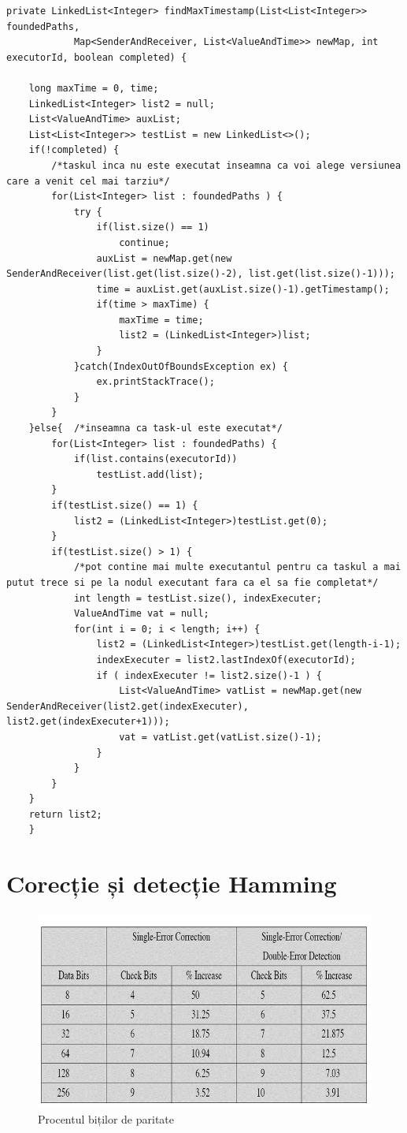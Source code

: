 \documentclass[12pt,a4paper]{report}
\begin{document}
\begin{lstlisting}[label={alg:findMaxTimestamp},caption={Aflarea versiunii potrivite}]
private LinkedList<Integer> findMaxTimestamp(List<List<Integer>> foundedPaths,
			Map<SenderAndReceiver, List<ValueAndTime>> newMap, int executorId, boolean completed) {
			
	long maxTime = 0, time;
	LinkedList<Integer> list2 = null;
	List<ValueAndTime> auxList;
	List<List<Integer>> testList = new LinkedList<>();
	if(!completed) {		
		/*taskul inca nu este executat inseamna ca voi alege versiunea care a venit cel mai tarziu*/
		for(List<Integer> list : foundedPaths ) {
			try {
				if(list.size() == 1)
					continue;
				auxList = newMap.get(new SenderAndReceiver(list.get(list.size()-2), list.get(list.size()-1)));		
				time = auxList.get(auxList.size()-1).getTimestamp(); 
				if(time > maxTime) {
					maxTime = time;
					list2 = (LinkedList<Integer>)list;
				}
			}catch(IndexOutOfBoundsException ex) {
				ex.printStackTrace();
			}
		}
	}else{	/*inseamna ca task-ul este executat*/
		for(List<Integer> list : foundedPaths) {
			if(list.contains(executorId))
				testList.add(list);
		}
		if(testList.size() == 1) {
			list2 = (LinkedList<Integer>)testList.get(0);
		}
		if(testList.size() > 1) {		
			/*pot contine mai multe executantul pentru ca taskul a mai putut trece si pe la nodul executant fara ca el sa fie completat*/
			int length = testList.size(), indexExecuter;
			ValueAndTime vat = null;
			for(int i = 0; i < length; i++) {	
				list2 = (LinkedList<Integer>)testList.get(length-i-1);
				indexExecuter = list2.lastIndexOf(executorId);
				if ( indexExecuter != list2.size()-1 ) {
					List<ValueAndTime> vatList = newMap.get(new SenderAndReceiver(list2.get(indexExecuter), list2.get(indexExecuter+1)));
					vat = vatList.get(vatList.size()-1);
				}	
			}
		}	
	}
	return list2;
	}
\end{lstlisting}


\section{Corecție și detecție Hamming}
\iftrue
\begin{figure}[th]
\centering
\includegraphics[width=6in]{pics/hamming.png}
  \caption[Procentul biților de paritate]{Procentul biților de paritate\protect\footnotemark}
  \label{fig:pic3}
\end{figure}
\fi
\newpage
\iftrue
\end{document}
